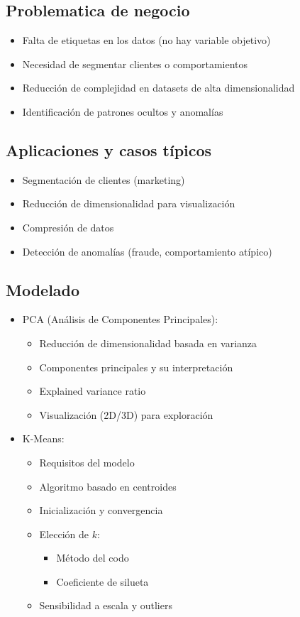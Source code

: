 \documentclass[12pt,a4paper,openany,oneside]{book}
\begin{document}
\begin{itemize}
\subsection{Problematica de negocio}
\begin{itemize}
    \item Falta de etiquetas en los datos (no hay variable objetivo)
    \item Necesidad de segmentar clientes o comportamientos
    \item Reducción de complejidad en datasets de alta dimensionalidad
    \item Identificación de patrones ocultos y anomalías
\end{itemize}

\subsection{Aplicaciones y casos típicos}
\begin{itemize}
    \item Segmentación de clientes (marketing)
    \item Reducción de dimensionalidad para visualización
    \item Compresión de datos
    \item Detección de anomalías (fraude, comportamiento atípico)
\end{itemize}

\subsection{Modelado}
\begin{itemize}
    \item PCA (Análisis de Componentes Principales):
    \begin{itemize}
        \item Reducción de dimensionalidad basada en varianza
        \item Componentes principales y su interpretación
        \item Explained variance ratio
        \item Visualización (2D/3D) para exploración
    \end{itemize}

    \item K-Means:
    \begin{itemize}
        \item Requisitos del modelo
        \item Algoritmo basado en centroides
        \item Inicialización y convergencia
        \item Elección de $k$:
        \begin{itemize}
            \item Método del codo
            \item Coeficiente de silueta
        \end{itemize}
        \item Sensibilidad a escala y outliers
    \end{itemize}


\end{itemize}
\end{itemize}
\end{document}
